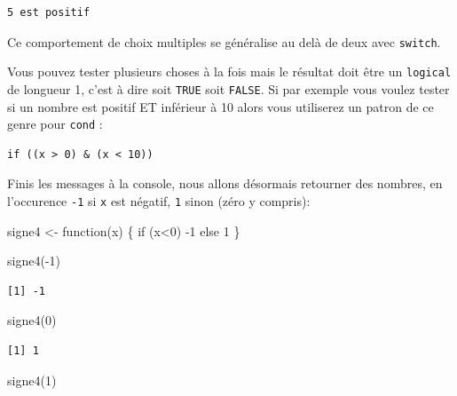 \documentclass[
  letterpaper,
  DIV=11,
  numbers=noendperiod]{scrreprt}
\newenvironment{Shaded}{\begin{snugshade}}{\end{snugshade}}
\newcommand{\ControlFlowTok}[1]{\textcolor[rgb]{0.00,0.23,0.31}{#1}}
\newcommand{\DecValTok}[1]{\textcolor[rgb]{0.68,0.00,0.00}{#1}}
\newcommand{\FunctionTok}[1]{\textcolor[rgb]{0.28,0.35,0.67}{#1}}
\newcommand{\NormalTok}[1]{\textcolor[rgb]{0.00,0.23,0.31}{#1}}
\newcommand{\OtherTok}[1]{\textcolor[rgb]{0.00,0.23,0.31}{#1}}
\newcommand{\SpecialCharTok}[1]{\textcolor[rgb]{0.37,0.37,0.37}{#1}}
\begin{document}
\begin{verbatim}
5 est positif
\end{verbatim}

Ce comportement de choix multiples se généralise au delà de deux avec
\texttt{switch}.

Vous pouvez tester plusieurs choses à la fois mais le résultat doit être
un \texttt{logical} de longueur 1, c'est à dire soit \texttt{TRUE} soit
\texttt{FALSE}. Si par exemple vous voulez tester si un nombre est
positif ET inférieur à 10 alors vous utiliserez un patron de ce genre
pour \texttt{cond} :

\begin{verbatim}
if ((x > 0) & (x < 10))
\end{verbatim}

Finis les messages à la console, nous allons désormais retourner des
nombres, en l'occurence \texttt{-1} si \texttt{x} est négatif,
\texttt{1} sinon (zéro y compris):

\begin{Shaded}
\begin{Highlighting}[]
\NormalTok{signe4 }\OtherTok{\textless{}{-}} \ControlFlowTok{function}\NormalTok{(x) \{}
  \ControlFlowTok{if}\NormalTok{ (x}\SpecialCharTok{\textless{}}\DecValTok{0}\NormalTok{)}
    \SpecialCharTok{{-}}\DecValTok{1}
  \ControlFlowTok{else}
    \DecValTok{1}
\NormalTok{\}}

\FunctionTok{signe4}\NormalTok{(}\SpecialCharTok{{-}}\DecValTok{1}\NormalTok{)}
\end{Highlighting}
\end{Shaded}

\begin{verbatim}
[1] -1
\end{verbatim}

\begin{Shaded}
\begin{Highlighting}[]
\FunctionTok{signe4}\NormalTok{(}\DecValTok{0}\NormalTok{)}
\end{Highlighting}
\end{Shaded}

\begin{verbatim}
[1] 1
\end{verbatim}

\begin{Shaded}
\begin{Highlighting}[]
\FunctionTok{signe4}\NormalTok{(}\DecValTok{1}\NormalTok{)}
\end{Highlighting}
\end{Shaded}
\end{document}
